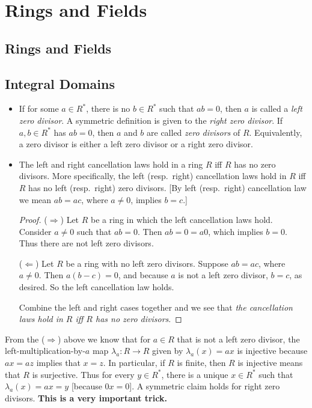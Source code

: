\documentclass[11pt]{article}
\newcommand{\df}[1]{\textit{\textsf{#1}}}
\renewcommand{\implies}{\Rightarrow}
\renewcommand{\impliedby}{\Leftarrow}
\begin{document}
\section{Rings and Fields}
\setcounter{subsection}{17}
\subsection{Rings and Fields}
\subsection{Integral Domains}
\begin{itemize}
    \item If for some $a \in R^*$, there is no $b \in R^*$ such that $ab = 0$, then $a$ is called a \df{left zero divisor}. A symmetric definition is given to the \df{right zero divisor}. If $a,b \in R^*$ has $ab=0$, then $a$ and $b$ are called \df{zero divisors} of $R$. Equivalently, a zero divisor is either a left zero divisor or a right zero divisor.
    \item The left and right cancellation laws hold in a ring $R$ iff $R$ has no zero divisors. More specifically, the left (resp.\ right) cancellation laws hold in $R$ iff $R$ has no left (resp.\ right) zero divisors. [By left (resp.\ right) cancellation law we mean $ab = ac$, where $a \neq 0$, implies $b=c$.]
    \begin{proof}
        ($\implies$) Let $R$ be a ring in which the left cancellation laws hold. Consider $a \neq 0$ such that $ab=0$. Then $ab = 0 = a0$, which implies $b=0$. Thus there are not left zero divisors.

        ($\impliedby$) Let $R$ be a ring with no left zero divisors. Suppose $ab=ac$, where $a \neq 0$. Then $a(b-c)=0$, and because $a$ is not a left zero divisor, $b=c$, as desired. So the left cancellation law holds.

        Combine the left and right cases together and we see that \emph{the cancellation laws hold in $R$ iff $R$ has no zero divisors}.
    \end{proof}
\end{itemize}
\begin{framed}
From the ($\implies$) above we know that for $a \in R$ that is not a left zero divisor, the left-multiplication-by-$a$ map $\lambda_a\colon R \to R$ given by $\lambda_a(x) = ax$ is injective because $ax = az$ implies that $x = z$. In particular, if $R$ is finite, then $R$ is injective means that $R$ is surjective. Thus for every $y \in R^*$, there is a unique $x \in R^*$ such that $\lambda_a(x)=ax=y$ [because $0x=0$]. A symmetric claim holds for right zero divisors. \textbf{This is a very important trick.}
\end{framed}
\end{document}
